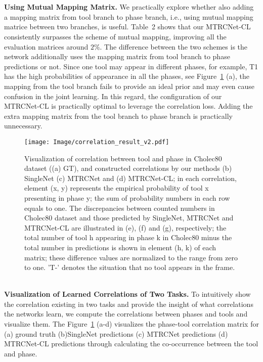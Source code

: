 \documentclass{elsarticle}
\begin{document}
\\
\\
\textbf{Using Mutual Mapping Matrix.}
We practically explore whether also adding a mapping matrix from tool branch to phase branch, i.e., using mutual mapping matrice between two branches, is useful.
Table~2 shows that our MTRCNet-CL consistently surpasses the scheme of mutual mapping, improving all the evaluation matrices around $2\%$.
The difference between the two schemes is the network additionally uses the mapping matrix from tool branch to phase predictions or not.
Since one tool may appear in different phases, for example, T1 has the high probabilities of appearance in all the phases, see Figure~\ref{fig:correlation} (a),
the mapping from the tool branch fails to provide an ideal prior and may even cause confusion in the joint learning.
In this regard, the configuration of our MTRCNet-CL is practically optimal to leverage the correlation loss.
Adding the extra mapping matrix from the tool branch to phase branch is practically unnecessary.
\\
\begin{figure}[t]
	\color{blue}
	\centering
	\texttt{[image: Image/correlation\_result\_v2.pdf]}
	\caption{
		Visualization of correlation between tool and phase in Cholec80 dataset ((a) GT), and constructed correlations by our methods (b) SingleNet (c) MTRCNet and (d) MTRCNet-CL; in each correlation, element (x, y) represents the empirical probability of tool x presenting in phase y; the sum of probability numbers in each row equals to one. 
		The discrepancies between counted numbers in Cholec80 dataset and those predicted by SingleNet, MTRCNet and MTRCNet-CL are illustrated in (e), (f) and (g), respectively; the total number of tool h appearing in phase k in Cholec80 minus the total number in predictions is shown in element (h, k) of each matrix; these difference values are normalized to the range from zero to one. 
		'T-' denotes the situation that no tool appears in the frame. }
	\label{fig:correlation}
\end{figure}
\\
\textbf{Visualization of Learned Correlations of Two Tasks.}
To intuitively show the correlation existing in two tasks and provide the insight of what correlations the networks learn,
we compute the correlations between phases and tools and visualize them.
The Figure~\ref{fig:correlation} (a-d) visualizes the phase-tool correlation matrix for (a) ground truth (b)SingleNet predictions (c) MTRCNet predictions (d) MTRCNet-CL predictions through calculating the co-occurrence between the tool and phase.
\end{document}

